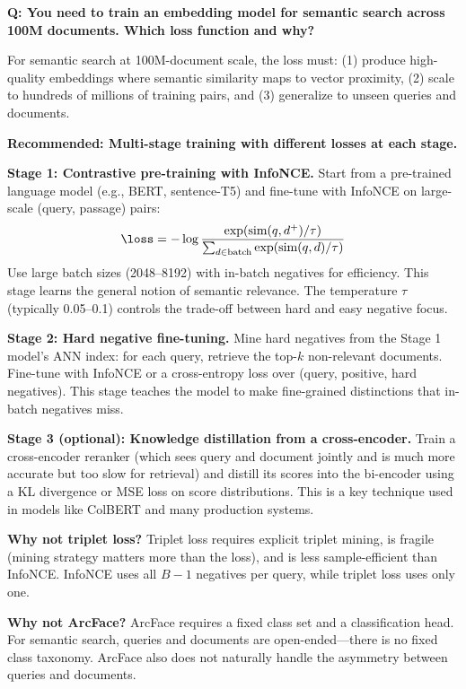 \begin{interviewq}
\textbf{Q: You need to train an embedding model for semantic search across 100M documents. Which loss function and why?}

 \quad {} \quad \badgefreq{\freqhigh}

\stronganswer For semantic search at 100M-document scale, the loss must: (1) produce high-quality embeddings where semantic similarity maps to vector proximity, (2) scale to hundreds of millions of training pairs, and (3) generalize to unseen queries and documents.

\textbf{Recommended: Multi-stage training with different losses at each stage.}

\textbf{Stage 1: Contrastive pre-training with InfoNCE.} Start from a pre-trained language model (e.g., BERT, sentence-T5) and fine-tune with InfoNCE on large-scale (query, passage) pairs:
$$\loss = -\log \frac{\exp(\text{sim}(q, d^+)/\tau)}{\sum_{d \in \text{batch}} \exp(\text{sim}(q, d)/\tau)}$$
Use large batch sizes (2048--8192) with in-batch negatives for efficiency. This stage learns the general notion of semantic relevance. The temperature $\tau$ (typically 0.05--0.1) controls the trade-off between hard and easy negative focus.

\textbf{Stage 2: Hard negative fine-tuning.} Mine hard negatives from the Stage 1 model's ANN index: for each query, retrieve the top-$k$ non-relevant documents. Fine-tune with InfoNCE or a cross-entropy loss over (query, positive, hard negatives). This stage teaches the model to make fine-grained distinctions that in-batch negatives miss.

\textbf{Stage 3 (optional): Knowledge distillation from a cross-encoder.} Train a cross-encoder reranker (which sees query and document jointly and is much more accurate but too slow for retrieval) and distill its scores into the bi-encoder using a KL divergence or MSE loss on score distributions. This is a key technique used in models like ColBERT and many production systems.

\textbf{Why not triplet loss?} Triplet loss requires explicit triplet mining, is fragile (mining strategy matters more than the loss), and is less sample-efficient than InfoNCE. InfoNCE uses all $B-1$ negatives per query, while triplet loss uses only one.

\textbf{Why not ArcFace?} ArcFace requires a fixed class set and a classification head. For semantic search, queries and documents are open-ended---there is no fixed class taxonomy. ArcFace also does not naturally handle the asymmetry between queries and documents.


\end{interviewq}
